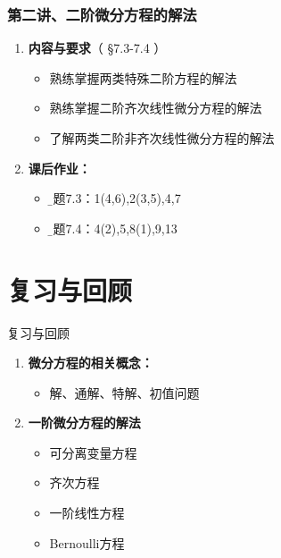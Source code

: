 
\begin{frame}
	\frametitle{第二讲、二阶微分方程的解法}
	\linespread{1.5}
	\begin{enumerate}
	  \item {\bf 内容与要求}{\color{blue}（ \S7.3-7.4 ）}
	  \begin{itemize}
	    \item 熟练掌握两类特殊二阶方程的解法
	    \item 熟练掌握二阶齐次线性微分方程的解法
	    \item 了解两类二阶非齐次线性微分方程的解法
	  \vspace{1em}
	  \end{itemize}
	  \item {\bf  课后作业：}
	  \begin{itemize}
	    \item {\b 习题7.3：1(4,6),2(3,5),4,7}
	    \item {\b 习题7.4：4(2),5,8(1),9,13}
	  \end{itemize}
	\end{enumerate}
\end{frame}

\section{复习与回顾}

\begin{frame}[<+->]{复习与回顾}
	\linespread{1.5}
	\begin{enumerate}
	  \item {\bf 微分方程的相关概念：}
	  \begin{itemize}
	    \item 解、通解、特解、初值问题
	  \end{itemize}
	  \item {\bf 一阶微分方程的解法}
	  \begin{itemize}
	    \item 可分离变量方程
	    \item 齐次方程
	    \item 一阶线性方程
	    \item Bernoulli方程
	  \end{itemize}
	\end{enumerate}
\end{frame}

